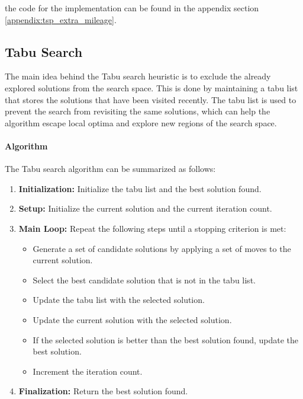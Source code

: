 \documentclass{article}
\begin{document}
the code for the implementation can be found in the appendix section \ref{appendix:tsp_extra_mileage}.

\subsection{Tabu Search}
The main idea behind the Tabu search heuristic is to exclude the already explored solutions from the search space. This is done by maintaining a tabu list that stores the solutions that have been visited recently. 
The tabu list is used to prevent the search from revisiting the same solutions, which can help the algorithm escape local optima and explore new regions of the search space.

\paragraph{Algorithm}
The Tabu search algorithm can be summarized as follows:
\begin{enumerate}
    \item \textbf{Initialization:} Initialize the tabu list and the best solution found.
    \item \textbf{Setup:} Initialize the current solution and the current iteration count.
    \item \textbf{Main Loop:} Repeat the following steps until a stopping criterion is met:
          \begin{itemize}
              \item Generate a set of candidate solutions by applying a set of moves to the current solution.
              \item Select the best candidate solution that is not in the tabu list.
              \item Update the tabu list with the selected solution.
              \item Update the current solution with the selected solution.
              \item If the selected solution is better than the best solution found, update the best solution.
              \item Increment the iteration count.
          \end{itemize}
    \item \textbf{Finalization:} Return the best solution found.
\end{enumerate}
\end{document}
